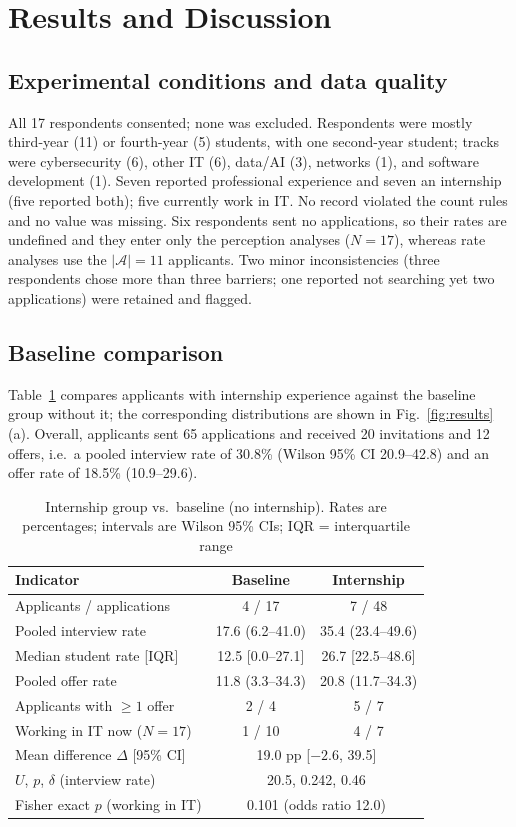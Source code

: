 \documentclass[conference]{IEEEtran}
\begin{document}
\section{Results and Discussion}
\label{sec:results}

\subsection{Experimental conditions and data quality}
All 17 respondents consented; none was excluded. Respondents were mostly third-year (11) or fourth-year (5) students, with one second-year student; tracks were cybersecurity (6), other IT (6), data/AI (3), networks (1), and software development (1). Seven reported professional experience and seven an internship (five reported both); five currently work in IT. No record violated the count rules and no value was missing. Six respondents sent no applications, so their rates are undefined and they enter only the perception analyses ($N=17$), whereas rate analyses use the $|\mathcal{A}|=11$ applicants. Two minor inconsistencies (three respondents chose more than three barriers; one reported not searching yet two applications) were retained and flagged.

\subsection{Baseline comparison}
Table~\ref{tab:results} compares applicants with internship experience against the baseline group without it; the corresponding distributions are shown in Fig.~\ref{fig:results}(a). Overall, applicants sent 65 applications and received 20 invitations and 12 offers, i.e.\ a pooled interview rate of 30.8\% (Wilson 95\% CI 20.9--42.8) and an offer rate of 18.5\% (10.9--29.6).

\begin{table}[t]
\centering
\caption{Internship group vs.\ baseline (no internship). Rates are percentages; intervals are Wilson 95\% CIs; IQR = interquartile range}
\label{tab:results}
\begin{tabular}{@{}lcc@{}}
\toprule
Indicator & Baseline & Internship \\
\midrule
Applicants / applications & 4 / 17 & 7 / 48 \\
Pooled interview rate & 17.6 (6.2--41.0) & 35.4 (23.4--49.6) \\
Median student rate [IQR] & 12.5 [0.0--27.1] & 26.7 [22.5--48.6] \\
Pooled offer rate & 11.8 (3.3--34.3) & 20.8 (11.7--34.3) \\
Applicants with $\ge 1$ offer & 2 / 4 & 5 / 7 \\
Working in IT now ($N{=}17$) & 1 / 10 & 4 / 7 \\
\midrule
Mean difference $\Delta$ [95\% CI] & \multicolumn{2}{c}{19.0 pp [$-2.6$, 39.5]} \\
$U$, $p$, $\delta$ (interview rate) & \multicolumn{2}{c}{20.5, 0.242, 0.46} \\
Fisher exact $p$ (working in IT) & \multicolumn{2}{c}{0.101 (odds ratio 12.0)} \\
\bottomrule
\end{tabular}
\end{table}
\end{document}

